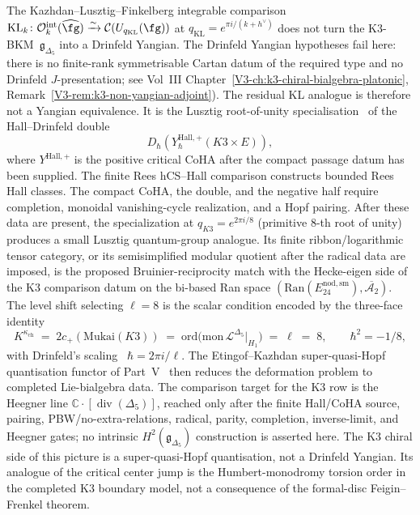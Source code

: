 \begin{remark}
\label{rem:dl-3-etingof-KL-parameters}
The Kazhdan--Lusztig--Finkelberg integrable comparison
\cite{KazhdanLusztig1993,KazhdanLusztig1994,Finkelberg96}
$\mathrm{KL}_k\colon \mathcal{O}^{\mathrm{int}}_k(\widehat{\fg})
\xrightarrow{\sim} \mathcal C(U_{q_{\mathrm{KL}}}(\fg))$ at
$q_{\mathrm{KL}} = e^{\pi i/(k+h^\vee)}$ does not turn the
K3-BKM~$\mathfrak{g}_{\Delta_5}$ into a Drinfeld Yangian. The
Drinfeld Yangian hypotheses fail here: there is no finite-rank
symmetrisable Cartan datum of the required type and no
Drinfeld \(J\)-presentation; see Vol~III
Chapter~\ref{V3-ch:k3-chiral-bialgebra-platonic},
Remark~\ref{V3-rem:k3-non-yangian-adjoint}). The residual KL analogue
is therefore not a Yangian equivalence. It is the Lusztig
root-of-unity specialisation~\cite{Lusztig1990,Lusztig1993} of the
Hall--Drinfeld double
\[
 D_\hbar\!\left(Y^{\mathrm{Hall},+}_\hbar(K3\times E)\right),
\]
where \(Y^{\mathrm{Hall},+}\) is the positive critical CoHA after the
compact passage datum has been supplied. The finite Rees hCS--Hall
comparison constructs bounded Rees Hall classes. The compact CoHA,
the double, and the negative half require completion, monoidal
vanishing-cycle realization, and a Hopf pairing. After these data are
present, the specialization at
$q_{K3} = e^{2\pi i/8}$ (primitive $8$-th root of unity) produces a
small Lusztig quantum-group analogue. Its finite ribbon/logarithmic
tensor category, or its semisimplified modular quotient after the
radical data are imposed, is the proposed Bruinier-reciprocity match
with the Hecke-eigen side of the K3 comparison datum on the
bi-based Ran space $(\mathrm{Ran}(E^{\mathrm{nod,sm}}_{24}),
\overline{\mathcal{A}_2})$. The level shift selecting $\ell=8$ is the
scalar condition encoded by the three-face
identity
\[
 K^{\kappa_{\mathrm{ch}}}
 \;=\;
 2c_+(\mathrm{Mukai}(K3))
 \;=\;
 \mathrm{ord}\!\bigl(\mathrm{mon}\,\mathcal{L}^{\Delta_5}|_{H_1}\bigr)
 \;=\;
 \ell
 \;=\;
 8,
 \qquad
 \hbar^2 = -1/8,
\]
with Drinfeld's scaling~\cite{Drinfeld1990}
$\hbar=2\pi i/\ell$. The Etingof--Kazhdan super-quasi-Hopf
quantisation functor of Part~V~\cite{EtingofKazhdan2007PartV}
then reduces the deformation problem to completed Lie-bialgebra data.
The comparison target for the K3 row is the Heegner line
$\mathbb C\cdot[\operatorname{div}(\Delta_5)]$, reached only after the
finite Hall/CoHA source, pairing, PBW/no-extra-relations, radical,
parity, completion, inverse-limit, and Heegner gates; no intrinsic
$H^2(\mathfrak g_{\Delta_5})$ construction is asserted here. The K3 chiral
side of this picture is a super-quasi-Hopf quantisation, not a
Drinfeld Yangian. Its analogue of the critical center jump is the
Humbert-monodromy torsion order in the completed K3 boundary model,
not a consequence of the formal-disc Feigin--Frenkel theorem.
\end{remark}

